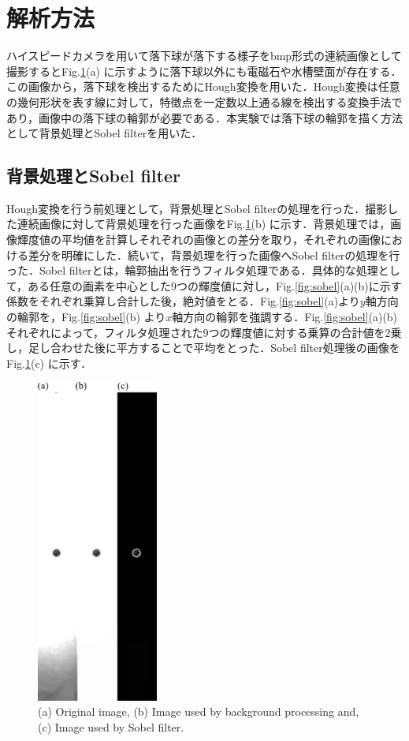\section{解析方法}
ハイスピードカメラを用いて落下球が落下する様子をbmp形式の連続画像として撮影するとFig.\ref{fig:expPhoto}(a) に示すように落下球以外にも電磁石や水槽壁面が存在する．この画像から，落下球を検出するためにHough変換を用いた．Hough変換は任意の幾何形状を表す線に対して，特徴点を一定数以上通る線を検出する変換手法であり，画像中の落下球の輪郭が必要である．本実験では落下球の輪郭を描く方法として背景処理とSobel filterを用いた．
\subsection{背景処理とSobel filter}
Hough変換を行う前処理として，背景処理とSobel filterの処理を行った．撮影した連続画像に対して背景処理を行った画像をFig.\ref{fig:expPhoto}(b) に示す．背景処理では，画像輝度値の平均値を計算しそれぞれの画像との差分を取り，それぞれの画像における差分を明確にした．続いて，背景処理を行った画像へSobel filterの処理を行った．Sobel filterとは，輪郭抽出を行うフィルタ処理である．具体的な処理として，ある任意の画素を中心とした9つの輝度値に対し，Fig.\ref{fig:sobel}(a)(b)に示す係数をそれぞれ乗算し合計した後，絶対値をとる．Fig.\ref{fig:sobel}(a)より$y$軸方向の輪郭を，Fig.\ref{fig:sobel}(b) より$x$軸方向の輪郭を強調する．Fig.\ref{fig:sobel}(a)(b)それぞれによって，フィルタ処理された9つの輝度値に対する乗算の合計値を2乗し，足し合わせた後に平方することで平均をとった．Sobel filter処理後の画像をFig.\ref{fig:expPhoto}(c) に示す．

\begin{figure}[h]
    \centering
    \includegraphics[width=4.0cm,clip]{3-Analysis/exp-img.png}
    \caption{(a) Original image, (b) Image used by background processing and, (c) Image used by Sobel filter.}
    \label{fig:expPhoto}
\end{figure}

